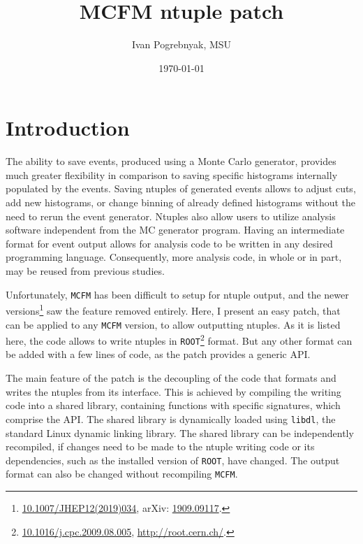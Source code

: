 \documentclass[12pt]{article}
\title{MCFM ntuple patch}
\author{Ivan Pogrebnyak, MSU}
\date{\today}
\begin{document}
\maketitle
\sloppy %

\section{Introduction}

The ability to save events, produced using a Monte Carlo generator, provides
much greater flexibility in comparison to saving specific histograms internally
populated by the events.
Saving ntuples of generated events allows to adjust cuts, add new histograms,
or change binning of already defined histograms without the need to rerun the
event generator.
Ntuples also allow users to utilize analysis software independent from the MC
generator program.
Having an intermediate format for event output allows for
analysis code to be written in any desired programming language.
Consequently, more analysis code, in whole or in part, may be reused from
previous studies.

Unfortunately, \texttt{MCFM} has been difficult to setup for ntuple output, and
the newer versions\footnote{
  \href{http://dx.doi.org/10.1007/jhep12(2019)034}{10.1007/JHEP12(2019)034},
  arXiv: \href{https://arxiv.org/abs/1909.09117}{1909.09117}.
} saw the feature removed entirely.
Here, I present an easy patch, that can be applied to any \texttt{MCFM}
version, to allow outputting ntuples.
As it is listed here, the code allows to write ntuples in
\texttt{ROOT}\footnote{
  \href{https://doi.org/10.1016/j.cpc.2009.08.005}{10.1016/j.cpc.2009.08.005},
  \url{http://root.cern.ch/}.
} format.
But any other format can be added with a few lines of code, as the patch
provides a generic API.

The main feature of the patch is the decoupling of the code that formats and
writes the ntuples from its interface.
This is achieved by compiling the writing code into a shared library,
containing functions with specific signatures, which comprise the API.
The shared library is dynamically loaded using \texttt{libdl},
the standard Linux dynamic linking library.
The shared library can be independently recompiled, if changes need to be made
to the ntuple writing code or its dependencies, such as the installed version
of \texttt{ROOT}, have changed.
The output format can also be changed without recompiling \texttt{MCFM}.
\end{document}
